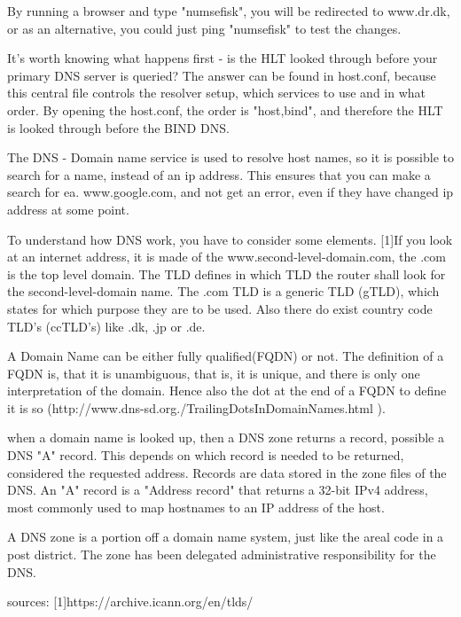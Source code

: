 By running a browser and type "numsefisk", you will be redirected to www.dr.dk, or as an alternative, you could just ping "numsefisk" to test the changes.

It's worth knowing what happens first - is the HLT looked through before your primary DNS server is queried? 
The answer can be found in host.conf, because this central file controls the resolver setup, which services to use and in what order. By opening the host.conf, the order is "host,bind", and therefore the HLT is looked through before the BIND DNS.


The DNS - Domain name service  is used to resolve host names, so it is possible to search for a name, instead of an ip address. This ensures that you can make a search for ea. www.google.com, and not get an error, even if they have changed ip address at some point. 

To understand how DNS work, you have to consider some elements. [1]If you look at an internet address, it is made of the www.second-level-domain.com, the .com is the top level domain. The TLD defines in which TLD the router shall look for the second-level-domain name.
The .com TLD is a generic TLD (gTLD), which states for which purpose they are to be used. Also there do exist country code TLD's (ccTLD's) like .dk, .jp or .de.

A Domain Name can be either fully qualified(FQDN) or not. The definition of a FQDN is, that it is unambiguous, that is, it is unique, and there is only one interpretation of the domain. Hence also the dot at the end of a FQDN to define it is so (http://www.dns-sd.org./TrailingDotsInDomainNames.html ).

when a domain name is looked up, then a DNS zone returns a record, possible a DNS "A" record. This depends on which record is needed to be returned, considered the requested address. Records are data stored in the zone files of the DNS. An "A" record is a "Address record" that returns a 32-bit IPv4 address, most commonly used to map hostnames to an IP address of the host. 

A DNS zone is a portion off a domain name system, just like the areal code in a post district. The zone has been delegated administrative responsibility for the DNS.

sources:
[1]https://archive.icann.org/en/tlds/